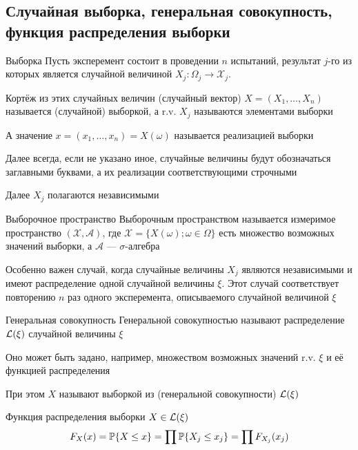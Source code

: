 \subsection{Случайная выборка, генеральная совокупность, функция распределения выборки}

\begin{dfn}{Выборка}
Пусть эксперемент состоит в проведении $n$ испытаний,
результат $j$-го из которых
является случайной величиной $X_j: \Omega_j\to\mathcal X_j$.

Кортёж из этих случайных величин (случайный вектор)
$X = (X_1, \dotsc, X_n)$ называется (случайной) выборкой,
а r.v. $X_j$ называются элементами выборки

А значение $x = (x_1, \dotsc, x_n) = X(\omega)$ называется реализацией выборки

Далее всегда, если не указано иное,
случайные величины будут обозначаться заглавными буквами,
а их реализации соответствующими строчными

Далее $X_j$ полагаются независимыми
\end{dfn}

\begin{dfn}{Выборочное пространство}
Выборочным пространством
называется измеримое пространство
$(\mathcal X, \mathcal A)$,
где $\mathcal X = \{X(\omega) ; \omega\in\Omega\}$
есть множество возможных значений выборки,
а $\mathcal A$ --- $\sigma$-алгебра
\end{dfn}

Особенно важен случай, когда случайные величины $X_j$
являются независимыми и
имеют распределение одной случайной величины $\xi$.
Этот случай соответствует повторению $n$ раз одного эксперемента,
описываемого случайной величиной $\xi$

\begin{dfn}{Генеральная совокупность}
Генеральной совокупностью
называют распределение $\mathcal L(\xi)$ случайной величины $\xi$

Оно может быть задано, например, множеством возможных значений r.v. $\xi$
и её функцией распределения

При этом $X$ называют выборкой из (генеральной совокупности) $\mathcal L(\xi)$
\end{dfn}

\begin{dfn}{Функция распределения выборки}
 $X\in\mathcal L(\xi)$
$$F_X(x) = \mathbb P\{X\leq x\} = \prod\mathbb P\{X_j\leq x_j\} = \prod F_{X_j}(x_j)$$
\end{dfn}
